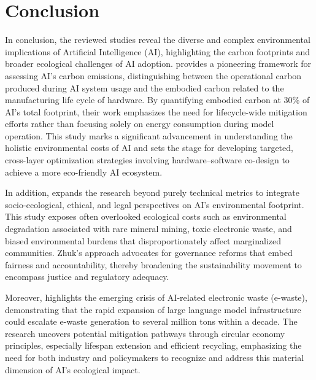 \documentclass[a4paper, 12pt]{article}
\begin{document}
\section{Conclusion}
In conclusion, the reviewed studies reveal the diverse and complex environmental implications of Artificial Intelligence (AI), highlighting the carbon footprints and broader ecological challenges of AI adoption. \citet{Wu2022} provides a pioneering framework for assessing AI’s carbon emissions, distinguishing between the operational carbon produced during AI system usage and the embodied carbon related to the manufacturing life cycle of hardware. By quantifying embodied carbon at 30\% of AI’s total footprint, their work emphasizes the need for lifecycle-wide mitigation efforts rather than focusing solely on energy consumption during model operation. This study marks a significant advancement in understanding the holistic environmental costs of AI and sets the stage for developing targeted, cross-layer optimization strategies involving hardware–software co-design to achieve a more eco-friendly AI ecosystem.  \hfill \break

\par In addition, \citet{Zhuk2023} expands the research beyond purely technical metrics to integrate socio-ecological, ethical, and legal perspectives on AI’s environmental footprint. This study exposes often overlooked ecological costs such as environmental degradation associated with rare mineral mining, toxic electronic waste, and biased environmental burdens that disproportionately affect marginalized communities. Zhuk’s approach advocates for governance reforms that embed fairness and accountability, thereby broadening the sustainability movement to encompass justice and regulatory adequacy.  \hfill \break

\par Moreover, \citet{wang_2024_ewaste} highlights the emerging crisis of AI-related electronic waste (e-waste), demonstrating that the rapid expansion of large language model infrastructure could escalate e-waste generation to several million tons within a decade. The research uncovers potential mitigation pathways through circular economy principles, especially lifespan extension and efficient recycling, emphasizing the need for both industry and policymakers to recognize and address this material dimension of AI’s ecological impact.  \hfill \break
\end{document}

